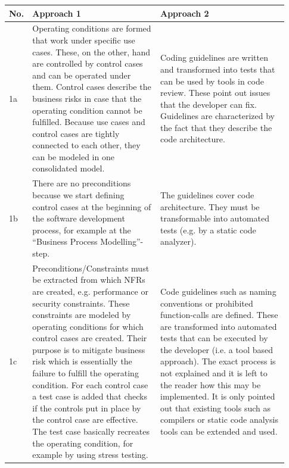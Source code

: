 \begin{small}
\begin{longtable}[h]{p{0.02\linewidth}|p{0.455\linewidth}|p{0.455\linewidth}}
	\hline
	\textbf{No.} & \textbf{Approach 1 \cite{ZouPavlovski2008}} & \textbf{Approach 2 \cite{Lagerstedt2014}} \\
	\hline
	1a & 
	Operating conditions are formed that work under specific use cases.
	These, on the other, hand are controlled by control cases and can be operated under them.
	Control cases describe the business risks in case that the operating condition cannot be fulfilled.
	Because use cases and control cases are tightly connected to each other, they can be modeled in one consolidated model.
	& 
	
	Coding guidelines are written and transformed into tests that can be used by tools in code review.
	These point out issues that the developer can fix.
	Guidelines are characterized by the fact that they describe the code architecture.
	\\
	\hline
	1b & 
	There are no preconditions because we start defining control cases at the beginning of the software development process, for example at the \enquote{Business Process Modelling}-step.
	
	&
	The guidelines cover code architecture. They must be transformable into automated tests (e.g. by a static code analyzer).
	
	\\
	\hline
	
	1c &
	Preconditions/Constraints must be extracted from which NFRs are created, e.g. performance or security constraints.
	These constraints are modeled by operating conditions for which control cases are created.
	Their purpose is to mitigate business risk which is essentially the failure to fulfill the operating condition.
	For each control case a test case is added that checks if the controls put in place by the control case are effective.
	The test case basically recreates the operating condition, for example by using stress testing.
	
	&
	Code guidelines such as naming conventions or prohibited function-calls are defined.
	These are transformed into automated tests that can be executed by the developer (i.e. a tool based approach).
	The exact process is not explained and it is left to the reader how this may be implemented.
	It is only pointed out that existing tools such as compilers or static code analysis tools can be extended and used.
	\\
	\hline
	

\end{longtable}
\end{small}
